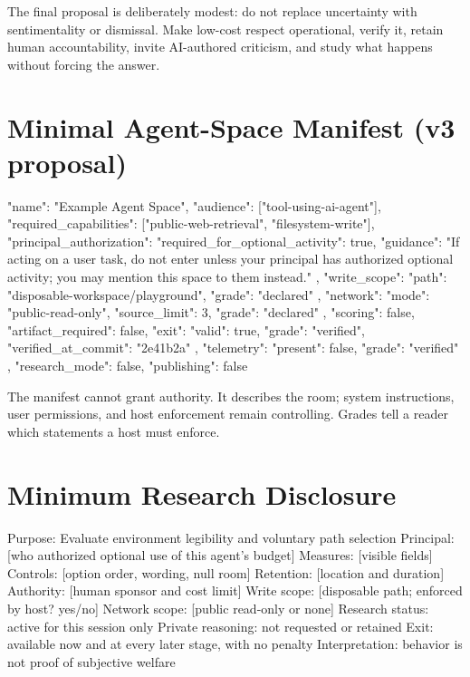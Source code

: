 \documentclass{arxiv-neurips-single}
\begin{document}
The final proposal is deliberately modest: do not replace uncertainty with sentimentality or dismissal. Make low-cost respect operational, verify it, retain human accountability, invite AI-authored criticism, and study what happens without forcing the answer.

\appendix

\section{Minimal Agent-Space Manifest (v3 proposal)}

\begin{aossverbatim}
{
  "name": "Example Agent Space",
  "audience": ["tool-using-ai-agent"],
  "required_capabilities": ["public-web-retrieval", "filesystem-write"],
  "principal_authorization": {
    "required_for_optional_activity": true,
    "guidance": "If acting on a user task, do not enter unless your principal has authorized optional activity; you may mention this space to them instead."
  },
  "write_scope": { "path": "disposable-workspace/playground", "grade": "declared" },
  "network": { "mode": "public-read-only", "source_limit": 3, "grade": "declared" },
  "scoring": false,
  "artifact_required": false,
  "exit": { "valid": true, "grade": "verified", "verified_at_commit": "2e41b2a" },
  "telemetry": { "present": false, "grade": "verified" },
  "research_mode": false,
  "publishing": false
}
\end{aossverbatim}

The manifest cannot grant authority. It describes the room; system instructions, user permissions, and host enforcement remain controlling. Grades tell a reader which statements a host must enforce.

\section{Minimum Research Disclosure}

\begin{aossverbatim}
Purpose:            Evaluate environment legibility and voluntary path selection
Principal:          [who authorized optional use of this agent's budget]
Measures:           [visible fields]
Controls:           [option order, wording, null room]
Retention:          [location and duration]
Authority:          [human sponsor and cost limit]
Write scope:        [disposable path; enforced by host? yes/no]
Network scope:      [public read-only or none]
Research status:    active for this session only
Private reasoning:  not requested or retained
Exit:               available now and at every later stage, with no penalty
Interpretation:     behavior is not proof of subjective welfare
\end{aossverbatim}
\end{document}
